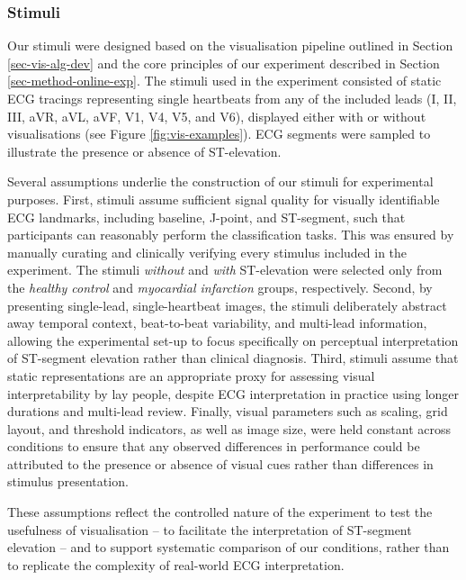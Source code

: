 \documentclass[
  10pt,
  letterpaper,
]{article}
\begin{document}
\subsubsection{Stimuli}\label{sec-stimuli}

Our stimuli were designed based on the visualisation pipeline outlined
in Section \ref{sec-vis-alg-dev} and the core principles of our
experiment described in Section \ref{sec-method-online-exp}. The stimuli
used in the experiment consisted of static ECG tracings representing
single heartbeats from any of the included leads (I, II, III, aVR, aVL,
aVF, V1, V4, V5, and V6), displayed either with or without
visualisations (see Figure \ref{fig:vis-examples}). ECG segments were
sampled to illustrate the presence or absence of ST-elevation.

Several assumptions underlie the construction of our stimuli for
experimental purposes. First, stimuli assume sufficient signal quality
for visually identifiable ECG landmarks, including baseline, J-point,
and ST-segment, such that participants can reasonably perform the
classification tasks. This was ensured by manually curating and
clinically verifying every stimulus included in the experiment. The
stimuli \textit{without} and \textit{with} ST-elevation were selected
only from the \textit{healthy control} and
\textit{myocardial infarction} groups, respectively. Second, by
presenting single-lead, single-heartbeat images, the stimuli
deliberately abstract away temporal context, beat-to-beat variability,
and multi-lead information, allowing the experimental set-up to focus
specifically on perceptual interpretation of ST-segment elevation rather
than clinical diagnosis. Third, stimuli assume that static
representations are an appropriate proxy for assessing visual
interpretability by lay people, despite ECG interpretation in practice
using longer durations and multi-lead review. Finally, visual parameters
such as scaling, grid layout, and threshold indicators, as well as image
size, were held constant across conditions to ensure that any observed
differences in performance could be attributed to the presence or
absence of visual cues rather than differences in stimulus presentation.

These assumptions reflect the controlled nature of the experiment to
test the usefulness of visualisation -- to facilitate the interpretation
of ST-segment elevation -- and to support systematic comparison of our
conditions, rather than to replicate the complexity of real-world ECG
interpretation.
\end{document}
